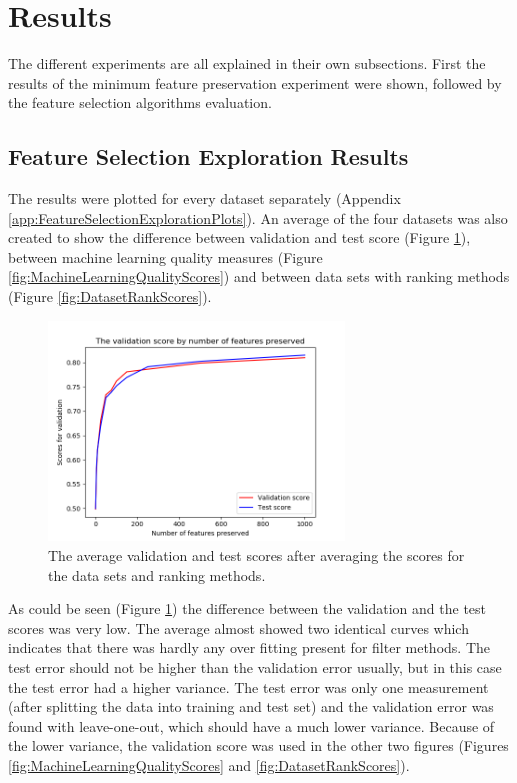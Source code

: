 \documentclass[10pt,a4paper]{report}
\begin{document}
	\newpage
	\section{Results}
	\label{FSsec:Results}
	
	The different experiments are all explained in their own subsections. First the results of the minimum feature preservation experiment were shown, followed by the feature selection algorithms evaluation.
	
	\subsection{Feature Selection Exploration Results}
	\label{FSsubsec:FeatureReductionExplorationResults}
	
	The results were plotted for every dataset separately (Appendix \ref{app:FeatureSelectionExplorationPlots}). An average of the four datasets was also created to show the difference between validation and test score (Figure \ref{fig:ValTestScores}), between machine learning quality measures (Figure \ref{fig:MachineLearningQualityScores}) and between data sets with ranking methods (Figure \ref{fig:DatasetRankScores}).
	
	\begin{figure}[H]
		\includegraphics[width=0.7\textwidth]{Val_Test_Scores.png}
		\caption{The average validation and test scores after averaging the scores for the data sets and ranking methods.}
		\label{fig:ValTestScores}
	\end{figure}
	
	As could be seen (Figure \ref{fig:ValTestScores}) the difference between the validation and the test scores was very low. The average almost showed two identical curves which indicates that there was hardly any over fitting present for filter methods. The test error should not be higher than the validation error usually, but in this case the test error had a higher variance. The test error was only one measurement (after splitting the data into training and test set) and the validation error was found with leave-one-out, which should have a much lower variance. Because of the lower variance, the validation score was used in the other two figures (Figures \ref{fig:MachineLearningQualityScores} and \ref{fig:DatasetRankScores}).
	
\end{document}
